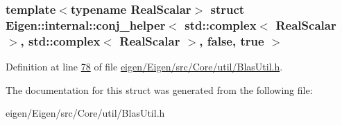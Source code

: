 \subsubsection*{template$<$typename Real\+Scalar$>$\newline
struct Eigen\+::internal\+::conj\+\_\+helper$<$ std\+::complex$<$ Real\+Scalar $>$, std\+::complex$<$ Real\+Scalar $>$, false, true $>$}



Definition at line \hyperlink{eigen_2_eigen_2src_2_core_2util_2_blas_util_8h_source_l00078}{78} of file \hyperlink{eigen_2_eigen_2src_2_core_2util_2_blas_util_8h_source}{eigen/\+Eigen/src/\+Core/util/\+Blas\+Util.\+h}.



The documentation for this struct was generated from the following file\+:\begin{DoxyCompactItemize}
\item 
eigen/\+Eigen/src/\+Core/util/\+Blas\+Util.\+h\end{DoxyCompactItemize}
